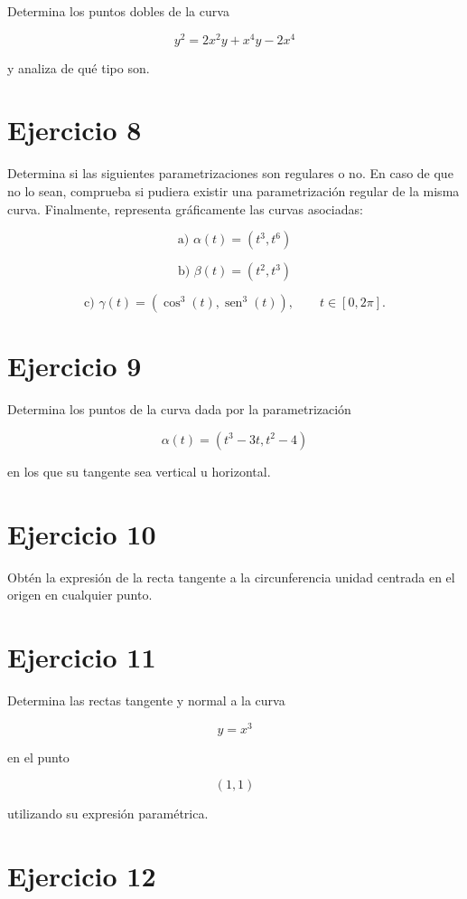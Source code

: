 \documentclass[11pt,a4paper]{article}
\newcommand{\sen}{\operatorname{sen}}
\begin{document}
Determina los puntos dobles de la curva

\[
y^2=2x^2y+x^4y-2x^4
\]

y analiza de qué tipo son.

\section{Ejercicio 8}

Determina si las siguientes parametrizaciones son regulares o no. En caso de que no lo sean, comprueba si pudiera existir una parametrización regular de la misma curva. Finalmente, representa gráficamente las curvas asociadas:

\[
\text{a) }\alpha(t)=(t^3,t^6)
\]

\[
\text{b) }\beta(t)=(t^2,t^3)
\]

\[
\text{c) }\gamma(t)=(\cos^3(t),\sen^3(t)),
\qquad
t\in[0,2\pi].
\]

\section{Ejercicio 9}

Determina los puntos de la curva dada por la parametrización

\[
\alpha(t)=(t^3-3t,t^2-4)
\]

en los que su tangente sea vertical u horizontal.

\section{Ejercicio 10}

Obtén la expresión de la recta tangente a la circunferencia unidad centrada en el origen en cualquier punto.

\section{Ejercicio 11}

Determina las rectas tangente y normal a la curva

\[
y=x^3
\]

en el punto

\[
(1,1)
\]

utilizando su expresión paramétrica.

\section{Ejercicio 12}
\end{document}
